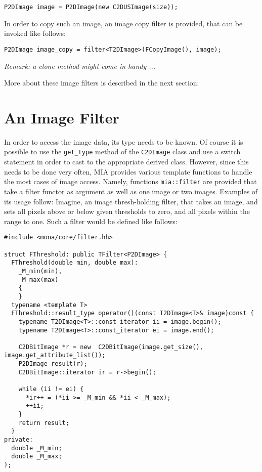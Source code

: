 \begin{lstlisting}
P2DImage image = P2DImage(new C2DUSImage(size)); 
\end{lstlisting}
 
In order to copy such an image, an image copy filter is provided, that can be invoked like follows: 

\begin{lstlisting}
P2DImage image_copy = filter<T2DImage>(FCopyImage(), image); 
\end{lstlisting}
\emph{Remark: a clone method might come in handy ...}

More about these image filters is described in the next section: 

\section{An Image Filter}
\label{sec:filter}

In order to access the image data, its type needs to be known. 
Of course it is possible to use the \texttt{get\_type} method of the \texttt{C2DImage} class and use
  a switch statement in order to cast to the appropriate derived class. 
However, since this needs to be done very often, MIA provides various template functions to handle the most cases
  of image access. 
Namely, functions \texttt{mia::filter} are provided that take a filter functor as argument as well as one image or two images. 
Examples of its usage follow: 
Imagine, an image thresh-holding filter, that takes an image, and sets all pixels above or below given thresholds to zero, and 
  all pixels within the range to one. 
Such a filter would be defined like follows:     

\lstset{language=c++,numbers=left}	
\begin{lstlisting}
#include <mona/core/filter.hh>

struct FThreshold: public TFilter<P2DImage> {
  FThreshold(double min, double max):
    _M_min(min), 
    _M_max(max)
    {
    }
  typename <template T> 
  FThreshold::result_type operator()(const T2DImage<T>& image)const {
    typename T2DImage<T>::const_iterator ii = image.begin(); 
    typename T2DImage<T>::const_iterator ei = image.end();
    
    C2DBitImage *r = new  C2DBitImage(image.get_size(), image.get_attribute_list()); 
    P2DImage result(r); 
    C2DBitImage::iterator ir = r->begin();
    
    while (ii != ei) {
      *ir++ = (*ii >= _M_min && *ii < _M_max); 
      ++ii; 
    }
    return result;     
  }
private: 
  double _M_min; 
  double _M_max; 
); 
\end{lstlisting}


